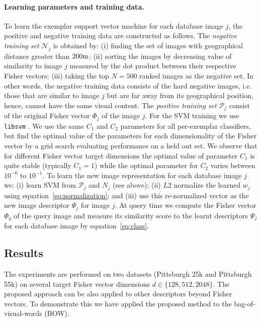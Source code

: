 \documentclass[10pt,twocolumn,letterpaper]{article}
\begin{document}
      \paragraph{Learning parameters and training data.}
         To learn the exemplar support vector machine for each database image $j$, the positive and negative training data are constructed as follows. The \emph{negative training set} $\mathcal N_j$ is obtained by: (i) finding the set of images with geographical distance greater than $200{\rm m}$; (ii)  sorting the images by decreasing value of similarity to image $j$ measured by the dot product between their respective Fisher vectors; (iii) taking the top $N=500$ ranked images as the negative set. In other words, the negative training data consists of the hard negative images, i.e. those that are similar to image $j$ but are far away from its geographical position, hence, cannot have the same visual content. The \emph{positive training set} $\mathcal P_j$
         consist of the original Fisher vector $\Phi_j$ of the image $j$.
         For the SVM training we use {\tt libsvm} \cite{libsvm}.
         We use the same $C_1$ and $C_2$ parameters for all per-exemplar classifiers, but find the optimal value of the parameters for each dimensionality of the Fisher vector by a grid search evaluating performance on a held out set.
         We observe that for different Fisher vector target dimensions the optimal value of parameter $C_1$ is quite stable (typically $C_1=1$) while the optimal parameter for $C_2$ varies between $10^{-6}$ to $10^{-1}$.
         To learn the new image representation for each database image $j$ we: (i) learn SVM from $\mathcal P_j$ and $N_j$ (see above); (ii) $L2$ normalize the learned $w_j$ using equation~\eqref{eq:normalization}; and (iii) use this re-normalized vector as the new image descriptor $\Psi_j$ for image $j$. At query time we compute the Fisher vector $\Phi_q$ of the query image and measure its similarity score to the learnt descriptors $\Psi_j$ for each database image by equation~\eqref{eq:class}.
   
   \subsection{Results} 
      The experiments are performed on two datasets (Pittsburgh 25k and Pittsburgh 55k) on several target Fisher vector dimensions $d\in\{128,512,2048\}$. The proposed approach can be also applied to other descriptors beyond Fisher vectors. To demonstrate this we have applied the proposed method to the bag-of-visual-words (BOW).
      
\end{document}
